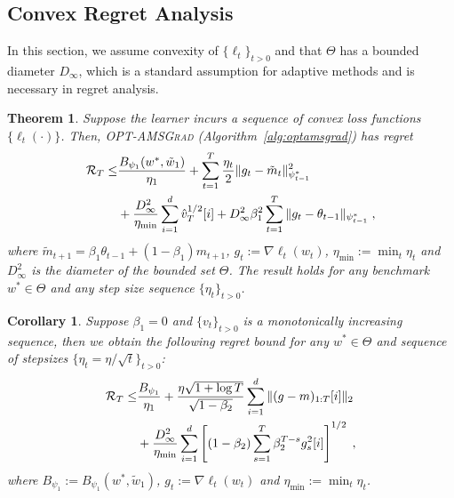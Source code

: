 \documentclass[twoside]{article}
\newtheorem{Theorem}{Theorem}
\newtheorem{Corollary}{Corollary}
\begin{document}
\vspace{-0.05in}
\subsection{Convex Regret Analysis}\label{sec:convex}
\vspace{-0.05in}

In this section, we assume convexity of $\{\ell_t\}_{t>0}$ and that $\Theta$ has a bounded diameter $D_{\infty}$, which is a standard assumption for adaptive methods \citep{RKK18,KB15} and is necessary in regret analysis.
\begin{Theorem} \label{thm:mainconvex}\vspace{0.05in}
Suppose the learner incurs a sequence of convex loss functions $\{ \ell_{t}(\cdot) \}$.
Then,  \textsc{OPT-AMSGrad} (Algorithm~\ref{alg:optamsgrad}) has regret 
\begin{equation} \notag
\begin{split}
\mathcal{R}_T \leq &   \frac{ B_{\psi_1}(w^*, \tilde{w}_{1})}{\eta_1}
+ \sum_{t=1}^T\frac{\eta_t}{2} \| g_t - \tilde{m}_t  \|_{\psi_{t-1}^*}^2 \\
& + \frac{D_{\infty}^2}{\eta_{\min}}  \sum_{i=1}^d \hat{v}_{T}^{1/2}[i] + D_{\infty}^2\beta_1^2   \sum_{t=1}^T  \| g_t - \theta_{t-1}  \|_{\psi_{t-1}^*}\;,
\end{split}
\end{equation}
where $ \tilde{m}_{t+1}  = \beta_1 \theta_{t-1} +(1-\beta_1) m_{t+1}$, $g_{t}:= \nabla \ell_{t}(w_t)$, $\eta_{{\min}} := \min_{{t}} \eta_{t}$ and $D_{\infty}^2$ is the diameter of the bounded set $\Theta$.
The result holds for any benchmark $w^{*} \in \Theta$ and any step size sequence $\{ \eta_t \}_{t>0}$.
\end{Theorem}
\vspace{0.05in}
\begin{Corollary}\label{cor:corollary}
Suppose $\beta_1=0$ and $\{v_t\}_{t>0}$ is a monotonically increasing sequence, then we obtain the following regret bound for any $w^{*} \in \Theta$ and sequence of stepsizes $\{ \eta_t = \eta/\sqrt{t}\}_{t>0}$: 
\begin{equation}\notag
\begin{split}
\mathcal{R}_T \leq & \frac{ B_{\psi_1}}{\eta_1}
+ \frac{\eta \sqrt{1 + \log T}}{\sqrt{1 - \beta_2}} \sum_{i=1}^d \| (g-m)_{1:T}[i] \|_2\\
 &  +\frac{D_{\infty}^2}{\eta_{\min}} \sum_{i=1}^d \left[ (1-\beta_2) \sum_{s=1}^{T} \beta_2^{T-s} g^2_s[i] \right]^{1/2} \;,
\end{split}
\end{equation}
where $B_{\psi_1} := B_{\psi_1}(w^*, \tilde{w}_{1})$, $g_{t}:= \nabla \ell_{t}(w_t)$ and $\eta_{{\min}} := \min_{{t}} \eta_{t}$.
\end{Corollary}
\end{document}
